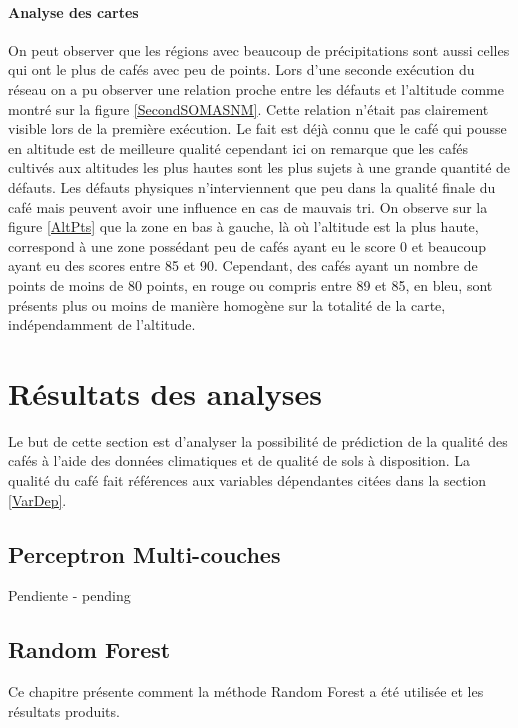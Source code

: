 \newpage
\paragraph{Analyse des cartes}On peut observer que les régions avec beaucoup de précipitations sont aussi celles qui ont le plus de cafés avec peu de points. Lors d'une seconde exécution du réseau on a pu observer une relation proche entre les défauts et l'altitude comme montré sur la figure \ref{SecondSOMASNM}. Cette relation n'était pas clairement visible lors de la première exécution. Le fait est déjà connu que le café qui pousse en altitude est de meilleure qualité cependant ici on remarque que les cafés cultivés aux altitudes les plus hautes sont les plus sujets à une grande quantité de défauts. Les défauts physiques n'interviennent que peu dans la qualité finale du café mais peuvent avoir une influence en cas de mauvais tri. On observe sur la figure \ref{AltPts} que la zone en bas à gauche, là où l'altitude est la plus haute, correspond à une zone possédant peu de cafés ayant eu le score 0 et beaucoup ayant eu des scores entre 85 et 90. Cependant, des cafés ayant un nombre de points de moins de 80 points, en rouge ou compris entre 89 et 85, en bleu, sont présents plus ou moins de manière homogène sur la totalité de la carte, indépendamment de l'altitude.  









\newpage

\section{Résultats des analyses  }
Le but de cette section est d'analyser la possibilité de prédiction de la qualité des cafés à l'aide des données climatiques et de qualité de sols à disposition. La qualité du café fait références aux variables dépendantes citées dans la section \ref{VarDep}.

\subsection{Perceptron Multi-couches}
Pendiente - pending


\subsection{Random Forest}
Ce chapitre présente comment la méthode Random Forest a été utilisée et les résultats produits. 
